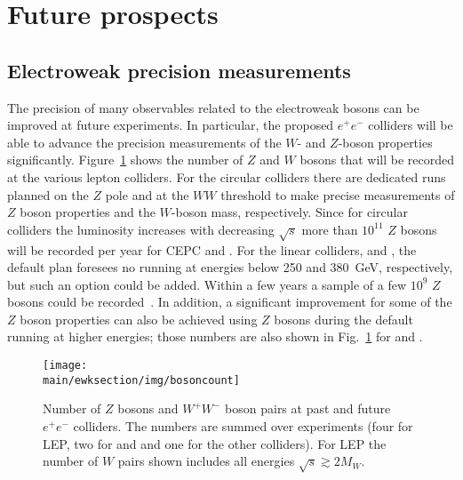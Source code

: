 \documentclass[../report.tex]{subfiles}
\providecommand{\main}{..}
\newcommand{\ew}{electroweak\xspace}
\begin{document}
\section{Future prospects}
\subsection{Electroweak precision measurements}
The precision of many observables related to the \ew bosons can be improved at future experiments. In particular, the proposed $e^+e^-$ colliders will be able to advance the precision measurements of the $W$- and $Z$-boson properties significantly. Figure~\ref{fig:ewkprogramme} shows the number of $Z$ and $W$ bosons that will be recorded at the various lepton colliders. For the circular colliders there are dedicated runs planned on the $Z$ pole and at the $WW$ threshold to make precise measurements of $Z$ boson properties and the $W$-boson mass, respectively. Since for circular colliders the luminosity increases with decreasing $\sqrt{s}$ more than $10^{11}$ $Z$ bosons will be recorded per year for CEPC and \FCCee. For the linear colliders, \ILC and \CLIC, the default plan foresees no running at energies below 250 and 380~GeV, respectively, but such an option could be added. Within a few years a sample of a few $10^9$ $Z$ bosons could be recorded~\cite{gigazilc,gigazclic}. In addition, a significant improvement for some of the $Z$ boson properties can also be achieved using $Z$ bosons during the default running at higher energies; those numbers are also shown in Fig.~\ref{fig:ewkprogramme} for \ILC and \CLIC.  

\begin{figure}[htbp]
    \centering
    \texttt{[image: \\main/ewksection/img/bosoncount]}
    \caption{Number of $Z$ bosons and $W^+W^-$ boson pairs at past and future $e^+e^-$ colliders. The numbers are summed over experiments (four for LEP, two for \FCCee and \CEPC and one for the other colliders). For LEP the number of $W$ pairs shown includes all energies $\sqrt{s}\gtrsim 2M_W$.
    \label{fig:ewkprogramme}}
\end{figure}
\end{document}
